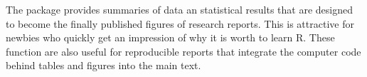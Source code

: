 The package  provides summaries of data an statistical
results that are designed to become the finally published figures of
research reports. This is attractive for newbies who quickly get an
impression of why it is worth to learn R. These function are also
useful for reproducible reports that integrate the computer code
behind tables and figures into the main text.
